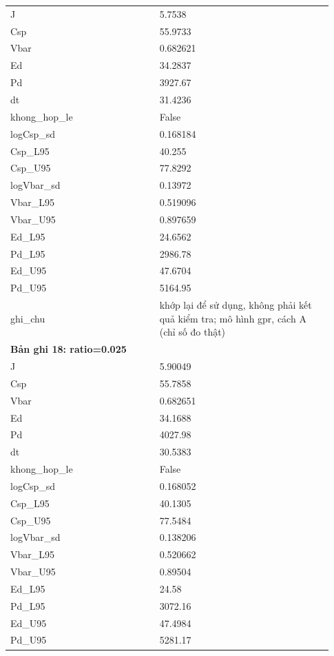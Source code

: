 \begin{longtable}{p{0.43\linewidth}p{0.50\linewidth}}
J & 5.7538 \\
Csp & 55.9733 \\
Vbar & 0.682621 \\
Ed & 34.2837 \\
Pd & 3927.67 \\
dt & 31.4236 \\
khong\_\allowbreak hop\_\allowbreak le & False \\
logCsp\_\allowbreak sd & 0.168184 \\
Csp\_\allowbreak L95 & 40.255 \\
Csp\_\allowbreak U95 & 77.8292 \\
logVbar\_\allowbreak sd & 0.13972 \\
Vbar\_\allowbreak L95 & 0.519096 \\
Vbar\_\allowbreak U95 & 0.897659 \\
Ed\_\allowbreak L95 & 24.6562 \\
Pd\_\allowbreak L95 & 2986.78 \\
Ed\_\allowbreak U95 & 47.6704 \\
Pd\_\allowbreak U95 & 5164.95 \\
ghi\_\allowbreak chu & khớp lại để sử dụng, không phải kết quả kiểm tra; mô hình gpr, cách A (chỉ số đo thật) \\
\midrule
\multicolumn{2}{p{0.95\linewidth}}{\textbf{Bản ghi 18: ratio=0.025}} \\
J & 5.90049 \\
Csp & 55.7858 \\
Vbar & 0.682651 \\
Ed & 34.1688 \\
Pd & 4027.98 \\
dt & 30.5383 \\
khong\_\allowbreak hop\_\allowbreak le & False \\
logCsp\_\allowbreak sd & 0.168052 \\
Csp\_\allowbreak L95 & 40.1305 \\
Csp\_\allowbreak U95 & 77.5484 \\
logVbar\_\allowbreak sd & 0.138206 \\
Vbar\_\allowbreak L95 & 0.520662 \\
Vbar\_\allowbreak U95 & 0.89504 \\
Ed\_\allowbreak L95 & 24.58 \\
Pd\_\allowbreak L95 & 3072.16 \\
Ed\_\allowbreak U95 & 47.4984 \\
Pd\_\allowbreak U95 & 5281.17 \\

\end{longtable}
